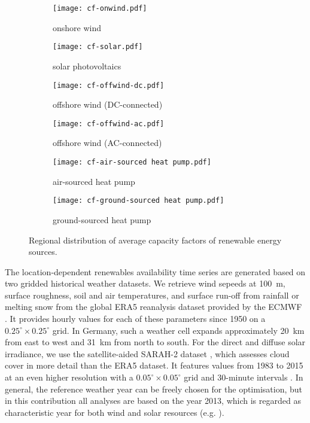 \begin{figure}
    \centering
    \begin{subfigure}[t]{0.49\textwidth}
        \centering
        \caption{onshore wind}
        \texttt{[image: cf-onwind.pdf]}
    \end{subfigure}
    \begin{subfigure}[t]{0.49\textwidth}
        \centering
        \caption{solar photovoltaics}
        \texttt{[image: cf-solar.pdf]}
    \end{subfigure}
    \begin{subfigure}[t]{0.49\textwidth}
        \centering
        \caption{offshore wind (DC-connected)}
        \texttt{[image: cf-offwind-dc.pdf]}
    \end{subfigure}
    \begin{subfigure}[t]{0.49\textwidth}
        \centering
        \caption{offshore wind (AC-connected)}
        \texttt{[image: cf-offwind-ac.pdf]}
    \end{subfigure}
    \begin{subfigure}[t]{0.49\textwidth}
        \centering
        \caption{air-sourced heat pump}
        \texttt{[image: cf-air-sourced heat pump.pdf]}
    \end{subfigure}
    \begin{subfigure}[t]{0.49\textwidth}
        \centering
        \caption{ground-sourced heat pump}
        \texttt{[image: cf-ground-sourced heat pump.pdf]}
    \end{subfigure}
    \caption{Regional distribution of average capacity factors of renewable energy sources.}
    \label{fig:cfs-maps}
\end{figure}




The location-dependent renewables availability time series are generated based
on two gridded historical weather datasets. We
retrieve wind sepeeds at \SI{100}{\metre}, surface roughness, soil and air
temperatures, and surface run-off from rainfall or melting snow from the global
ERA5 reanalysis dataset provided by the ECMWF . It provides hourly
values for each of these parameters since 1950 on a $0.25^{\circ} \times
0.25^{\circ}$ grid. In Germany, such a weather cell expands approximately
\SI{20}{\kilo\metre} from east to west and \SI{31}{km} from north to south. For
the direct and diffuse solar irradiance, we use the satellite-aided SARAH-2
dataset , which assesses cloud cover in more detail than the ERA5 dataset. It
features values from 1983 to 2015 at an even higher resolution with a
$0.05^{\circ} \times 0.05^{\circ}$ grid and 30-minute intervals . In
general, the reference weather year can be freely chosen for the optimisation,
but in this contribution all analyses are based on the year 2013, which is
regarded as characteristic year for both wind and solar resources (e.g.
).

